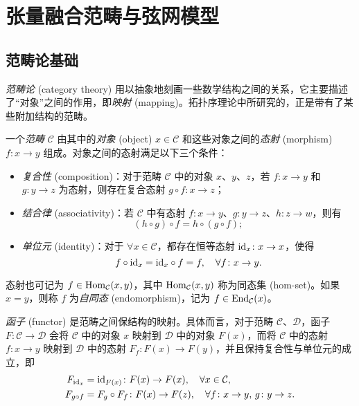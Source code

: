 \chapter{张量融合范畴与弦网模型}

\section{范畴论基础}

\emph{范畴论} (category theory)\cite{baez2011physics,maclane2013categories,beer2018categories} 用以抽象地刻画一些数学结构之间的关系，它主要描述了“对象”之间的作用，即\emph{映射} (mapping)。拓扑序理论中所研究的，正是带有了某些附加结构的范畴。

一个\emph{范畴} $\mathcal{C}$ 由其中的\emph{对象} (object) $x\in\mathcal{C}$ 和这些对象之间的\emph{态射} (morphism) $f\colon x\to y$ 组成。对象之间的态射满足以下三个条件：
\begin{itemize}
  \item \emph{复合性} (composition)：对于范畴 $\mathcal{C}$ 中的对象 $x$、$y$、$z$，若 $f\colon x\to y$ 和 $g\colon y\to z$ 为态射，则存在复合态射 $g\circ f\colon x\to z$；
  \item \emph{结合律} (associativity)：若 $\mathcal{C}$ 中有态射 $f\colon x\to y$、$g\colon y\to z$、$h\colon z\to w$，则有
    \begin{equation}
      (h\circ g)\circ f = h\circ (g\circ f);
    \end{equation}
  \item \emph{单位元} (identity)：对于 $\forall x\in\mathcal{C}$，都存在恒等态射 $\mathrm{id}_x\colon x\to x$，使得
    \begin{equation}
      f \circ \mathrm{id}_x = \mathrm{id}_x \circ f = f, \quad \forall f\colon x\to y.
    \end{equation}
\end{itemize}
态射也可记为 $f\in\operatorname{Hom}_{\mathcal{C}}(x,y)$，其中 $\operatorname{Hom}_{\mathcal{C}}(x,y)$ 称为同态集 (hom-set)。如果 $x=y$，则称 $f$ 为\emph{自同态} (endomorphism)，记为 $f\in\operatorname{End}_{\mathcal{C}}(x)$。

\emph{函子} (functor) 是范畴之间保结构的映射。具体而言，对于范畴 $\mathcal{C}$、$\mathcal{D}$，函子 $F\colon\mathcal{C}\to\mathcal{D}$ 会将 $\mathcal{C}$ 中的对象 $x$ 映射到 $\mathcal{D}$ 中的对象 $F(x)$，而将 $\mathcal{C}$ 中的态射 $f\colon x\to y$ 映射到 $\mathcal{D}$ 中的态射 $F_f\colon F(x)\to F(y)$，并且保持复合性与单位元的成立，即
\begin{align}
  F_{\mathrm{id}_x} &= \mathrm{id}_{F(x)} \colon F(x) \to F(x), \quad \forall x\in\mathcal{C}, \\
  F_{g\circ f} &= F_g \circ F_f \colon F(x) \to F(z), \quad \forall f\colon x\to y, \, g\colon y\to z.
\end{align}

